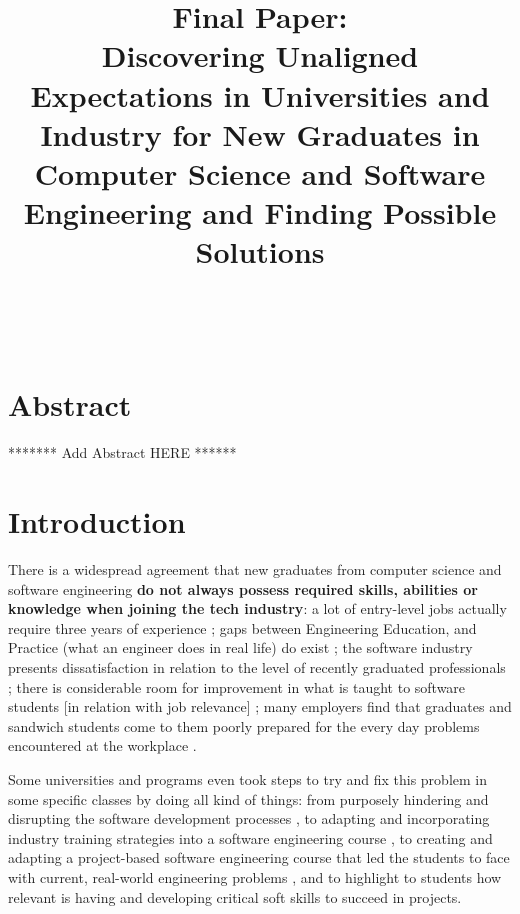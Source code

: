 \documentclass{sigchi}
\begin{document}
\title{Final Paper:\\ Discovering Unaligned Expectations in Universities and Industry for New Graduates in Computer Science and Software Engineering and Finding Possible Solutions}

\author{%
  \\
  \\
}

\maketitle

\section{Abstract}
 ******* Add Abstract HERE ******

\section{Introduction}
There is a widespread agreement that new graduates from computer science and software engineering \textbf{do not always possess required skills, abilities or knowledge when joining the tech industry}: a lot of entry-level jobs actually require three years of experience \cite{Chakrabarti2018}; gaps between Engineering Education, and Practice (what an engineer does in real life) do exist \cite{Sivanesan2017}; the software industry presents dissatisfaction in relation to the level of recently graduated professionals \cite{Portela2017}; there is considerable room for improvement in what is taught to software students [in relation with job relevance] \cite{Lethbridgea}; many employers find that graduates and sandwich students come to them poorly prepared for the every day problems encountered at the workplace \cite{Dawson2000}.

Some universities and programs even took steps to try and fix this problem in some specific classes by doing all kind of things: from purposely hindering and disrupting the software development processes \cite{Dawson2000}, to adapting and incorporating industry training strategies into a software engineering course \cite{Portela2017}, to creating and adapting a project-based software engineering course that led the students to face with current, real-world engineering problems \cite{Delgado2017}, and to highlight to students how relevant is having and developing critical soft skills to succeed in projects\cite{Bastarrica2017}.
\end{document}
